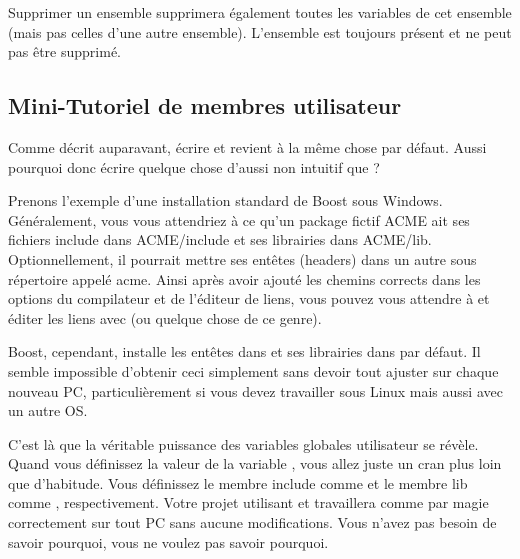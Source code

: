 Supprimer un ensemble supprimera également toutes les variables de cet ensemble (mais pas celles d'une autre ensemble). L'ensemble  est toujours présent et ne peut pas être supprimé.

\subsection{Mini-Tutoriel de membres utilisateur}\label{sec:mini_tutorial}

Comme décrit auparavant, écrire  et  revient à la même chose par défaut. Aussi pourquoi donc écrire quelque chose d'aussi non intuitif que ?

Prenons l'exemple d'une installation standard de Boost sous Windows. Généralement, vous vous attendriez à ce qu'un package fictif ACME ait ses fichiers include dans ACME/include et ses librairies dans ACME/lib. Optionnellement, il pourrait mettre ses entêtes (headers) dans un autre sous répertoire appelé acme. Ainsi après avoir ajouté les chemins corrects dans les options du compilateur et de l'éditeur de liens, vous pouvez vous attendre à  et éditer les liens avec  (ou quelque chose de ce genre).

Boost, cependant, installe les entêtes dans  et ses librairies dans  par défaut. Il semble impossible d'obtenir ceci simplement sans devoir tout ajuster sur chaque nouveau PC, particulièrement si vous devez travailler sous Linux mais aussi avec un autre OS.

C'est là que la véritable puissance des variables globales utilisateur se révèle. Quand vous définissez la valeur de la variable , vous allez juste un cran plus loin que d'habitude. Vous définissez le membre include comme  et le membre lib comme , respectivement. Votre projet utilisant  et  travaillera comme par magie correctement sur tout PC sans aucune modifications. Vous n'avez pas besoin de savoir pourquoi, vous ne voulez pas savoir pourquoi.
